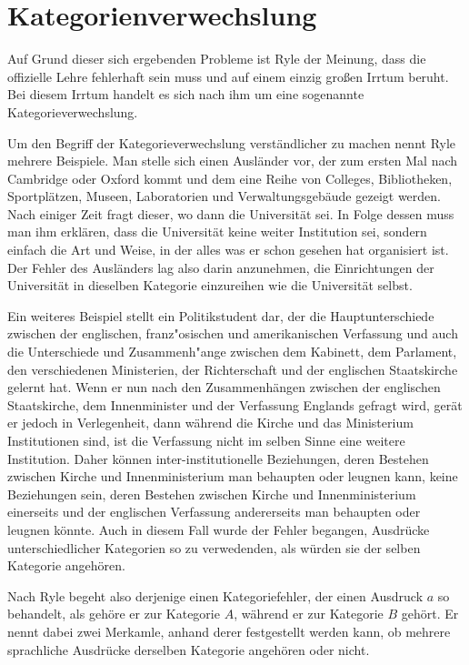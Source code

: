 \documentclass[a4paper]{article}
\begin{document}
\section{Kategorienverwechslung}
Auf Grund dieser sich ergebenden Probleme ist Ryle der Meinung, dass die offizielle Lehre fehlerhaft sein muss und auf einem einzig großen Irrtum beruht. Bei diesem Irrtum handelt es sich nach ihm um eine sogenannte Kategorieverwechslung.

Um den Begriff der Kategorieverwechslung verständlicher zu machen nennt Ryle mehrere Beispiele. Man stelle sich einen Ausländer vor, der zum ersten Mal nach Cambridge oder Oxford kommt und dem eine Reihe von Colleges, Bibliotheken, Sportplätzen, Museen, Laboratorien und Verwaltungsgebäude gezeigt werden. Nach einiger Zeit fragt dieser, wo dann die Universität sei. In Folge dessen muss man ihm erklären, dass die Universität keine weiter Institution sei, sondern einfach die Art und Weise, in der alles was er schon gesehen hat organisiert ist. Der Fehler des Ausländers lag also darin anzunehmen, die Einrichtungen der Universität in dieselben Kategorie einzureihen wie die Universität selbst. 

Ein weiteres Beispiel stellt ein Politikstudent dar, der die Hauptunterschiede zwischen der englischen, franz"osischen und amerikanischen Verfassung und auch die Unterschiede und Zusammenh"ange zwischen dem Kabinett, dem Parlament, den verschiedenen Ministerien, der Richterschaft und der englischen Staatskirche gelernt hat. Wenn er nun nach den Zusammenhängen zwischen der englischen Staatskirche, dem Innenminister und der Verfassung Englands gefragt wird, gerät er jedoch in Verlegenheit, dann während die Kirche und das Ministerium Institutionen sind, ist die Verfassung nicht im selben Sinne eine weitere Institution. Daher können inter-institutionelle Beziehungen, deren Bestehen zwischen Kirche und Innenministerium man behaupten oder leugnen kann, keine Beziehungen sein, deren Bestehen zwischen Kirche und Innenministerium einerseits und der englischen Verfassung andererseits man behaupten oder leugnen könnte. Auch in diesem Fall wurde der Fehler begangen, Ausdrücke unterschiedlicher Kategorien so zu verwedenden, als würden sie der selben Kategorie angehören.


Nach Ryle begeht also derjenige einen Kategoriefehler, der einen Ausdruck \(a\) so behandelt, als gehöre er zur Kategorie \(A\), während er zur Kategorie \(B\) gehört. Er nennt dabei zwei Merkamle, anhand derer festgestellt werden kann, ob mehrere sprachliche Ausdrücke derselben Kategorie angehören oder nicht.
\end{document}
